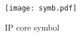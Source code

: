 \begin{figure}[!htbp]
    \centerline{\texttt{[image: symb.pdf]}}
    \vspace{0cm}\caption{IP core symbol}
    \label{fig:symbol}
\end{figure}

